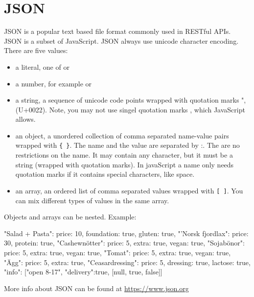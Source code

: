\section{JSON} \label{section:json}
JSON is a popular text based file format commonly used in RESTful APIs. JSON is a subset of JavaScript. JSON always use unicode character encoding. There are five values:
\begin{itemize}
  \item a literal, one of  or 
  \item a number, for example  or 
  \item a string, a sequence of unicode code points wrapped with quotation marks ", (U+0022). Note, you may not use singel quotation marks , which JavaScript allows.
  \item an object, a unordered collection of comma separated name-value pairs wrapped with \texttt{\{ \}}. The name and the value are separated by :. The are no restrictions on the name. It may contain any character, but it must be a string (wrapped with quotation marks). In javaScript a name only needs quotation marks if it contains special characters, like space.
 \item an array, an ordered list of comma separated values wrapped with \texttt{[ ]}. You can mix different types of values in the same array.
\end{itemize}
Objects and arrays can be nested. Example:
\begin{Code}
{
  "Salad + Pasta": {price: 10, foundation: true, gluten: true},
  "'Norsk fjordlax": {price: 30, protein: true},
  "Cashewnötter": {price: 5, extra: true, vegan: true},
  "Sojabönor": {price: 5, extra: true, vegan: true},
  "Tomat": {price: 5, extra: true, vegan: true},
  "Ägg": {price: 5, extra: true},
  "Ceasardressing": {price: 5, dressing: true, lactose: true},
  "info": ["open 8-17", {"delivery":true}, [null, true, false]]
}
\end{Code}
More info about JSON can be found at \url{https://www.json.org}


